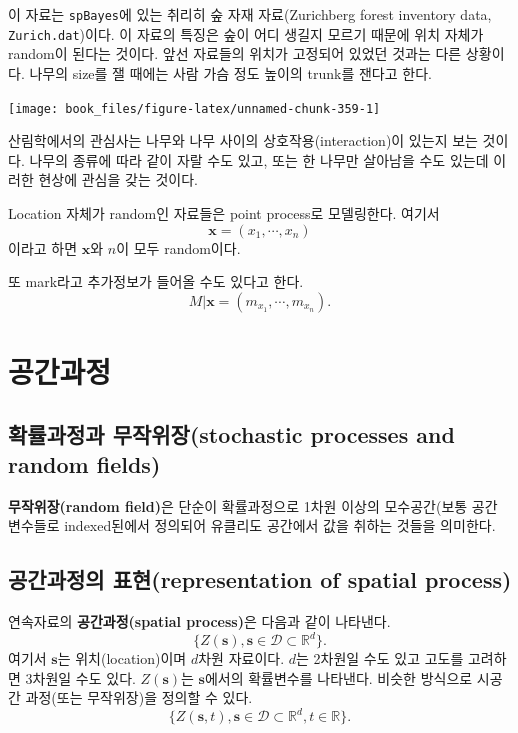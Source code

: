 \documentclass[b5paper,]{scrbook}
\theoremstyle{plain}
\theoremstyle{definition}
\numberwithin{equation}{section}
\begin{document}
이 자료는 \texttt{spBayes}에 있는 취리히 숲 자재 자료(Zurichberg forest inventory data, \texttt{Zurich.dat})이다. 이 자료의 특징은 숲이 어디 생길지 모르기 때문에 위치 자체가 random이 된다는 것이다. 앞선 자료들의 위치가 고정되어 있었던 것과는 다른 상황이다. 나무의 size를 잴 때에는 사람 가슴 정도 높이의 trunk를 잰다고 한다.

\begin{center}\texttt{[image: book\_files/figure-latex/unnamed-chunk-359-1]} \end{center}

산림학에서의 관심사는 나무와 나무 사이의 상호작용(interaction)이 있는지 보는 것이다. 나무의 종류에 따라 같이 자랄 수도 있고, 또는 한 나무만 살아남을 수도 있는데 이러한 현상에 관심을 갖는 것이다.

Location 자체가 random인 자료들은 point process로 모델링한다. 여기서
\[\mathbf{x}=(x_{1}, \cdots , x_{n})\]
이라고 하면 \(\mathbf{x}\)와 \(n\)이 모두 random이다.

또 mark라고 추가정보가 들어올 수도 있다고 한다.
\[M|\mathbf{x}=(m_{x_{1}}, \cdots , m_{x_{n}}).\]

\hypertarget{spatialprocess}{%
\chapter{공간과정}\label{spatialprocess}}

\hypertarget{-stochastic-processes-and-random-fields}{%
\section{확률과정과 무작위장(stochastic processes and random fields)}\label{-stochastic-processes-and-random-fields}}

\textbf{무작위장(random field)}은 단순이 확률과정으로 1차원 이상의 모수공간(보통 공간 변수들로 indexed된에서 정의되어 유클리도 공간에서 값을 취하는 것들을 의미한다.

\hypertarget{-representation-of-spatial-process}{%
\section{공간과정의 표현(representation of spatial process)}\label{-representation-of-spatial-process}}

연속자료의 \textbf{공간과정(spatial process)}은 다음과 같이 나타낸다.
\[\{Z (\mathbf{s}), \mathbf{s} \in \mathcal{D} \subset \mathbb{R}^{d} \} .\]
여기서 \(\mathbf{s}\)는 위치(location)이며 \(d\)차원 자료이다. \(d\)는 2차원일 수도 있고 고도를 고려하면 3차원일 수도 있다. \(Z(\mathbf{s})\)는 \(\mathbf{s}\)에서의 확률변수를 나타낸다. 비슷한 방식으로 시공간 과정(또는 무작위장)을 정의할 수 있다.
\[\{Z(\mathbf{s},t),  \mathbf{s} \in \mathcal{D} \subset \mathbb{R}^{d}, t\in\mathbb{R}\}.\]
\end{document}
